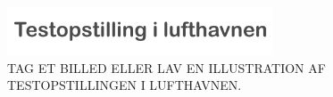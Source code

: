 %
\begin{figure}[H]
\centering
\includegraphics[width = 0.7\textwidth]{Figure/TestdesignParametre/ParametreTestopstilling} 
\caption{TAG ET BILLED ELLER LAV EN ILLUSTRATION AF TESTOPSTILLINGEN I LUFTHAVNEN.}
\label{fig:ParametreTestopstilling}
\end{figure}
\noindent
%  


